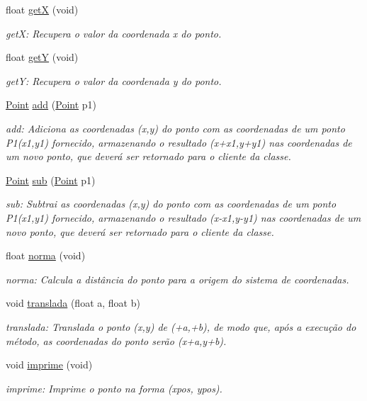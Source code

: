 \begin{DoxyCompactItemize}
float \mbox{\hyperlink{class_point_a9aa94b8fd07296e64d304ef3750db113}{getX}} (void)
\begin{DoxyCompactList}\small\item\em getX\+: Recupera o valor da coordenada x do ponto. \end{DoxyCompactList}\item 
\mbox{\label{class_point_a2444daa96871c89614510bc4bfcd19ce}} 
float \mbox{\hyperlink{class_point_a2444daa96871c89614510bc4bfcd19ce}{getY}} (void)
\begin{DoxyCompactList}\small\item\em getY\+: Recupera o valor da coordenada y do ponto. \end{DoxyCompactList}\item 
\mbox{\hyperlink{class_point}{Point}} \mbox{\hyperlink{class_point_a9dbea84b07b0a8ec3bbb9e58b3d15899}{add}} (\mbox{\hyperlink{class_point}{Point}} p1)
\begin{DoxyCompactList}\small\item\em add\+: Adiciona as coordenadas (x,y) do ponto com as coordenadas de um ponto P1(x1,y1) fornecido, armazenando o resultado (x+x1,y+y1) nas coordenadas de um novo ponto, que deverá ser retornado para o cliente da classe. \end{DoxyCompactList}\item 
\mbox{\hyperlink{class_point}{Point}} \mbox{\hyperlink{class_point_a9cf2c53b0a4e6282a6712824bb4e9b00}{sub}} (\mbox{\hyperlink{class_point}{Point}} p1)
\begin{DoxyCompactList}\small\item\em sub\+: Subtrai as coordenadas (x,y) do ponto com as coordenadas de um ponto P1(x1,y1) fornecido, armazenando o resultado (x-\/x1,y-\/y1) nas coordenadas de um novo ponto, que deverá ser retornado para o cliente da classe. \end{DoxyCompactList}\item 
float \mbox{\hyperlink{class_point_aa3005a9d97e2cb05624414973a214788}{norma}} (void)
\begin{DoxyCompactList}\small\item\em norma\+: Calcula a distância do ponto para a origem do sistema de coordenadas. \end{DoxyCompactList}\item 
void \mbox{\hyperlink{class_point_ad9676e36f3444534b609e3c68422239a}{translada}} (float a, float b)
\begin{DoxyCompactList}\small\item\em translada\+: Translada o ponto (x,y) de (+a,+b), de modo que, após a execução do método, as coordenadas do ponto serão (x+a,y+b). \end{DoxyCompactList}\item 
void \mbox{\hyperlink{class_point_a188350fb70e5b297a659a31ab8887ca3}{imprime}} (void)
\begin{DoxyCompactList}\small\item\em imprime\+: Imprime o ponto na forma (xpos, ypos). \end{DoxyCompactList}\end{DoxyCompactItemize}


